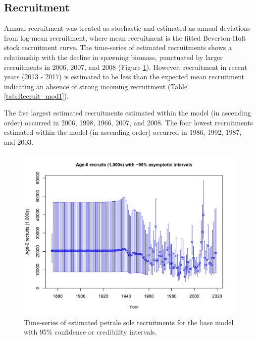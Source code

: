 \documentclass[12pt,]{article}
\begin{document}
\FloatBarrier

\subsection*{Recruitment}\label{recruitment}

Annual recruitment was treated as stochastic and estimated as annual
deviations from log-mean recruitment, where mean recruitment is the
fitted Beverton-Holt stock recruitment curve. The time-series of
estimated recruitments shows a relationship with the decline in spawning
biomass, punctuated by larger recruitments in 2006, 2007, and 2008
(Figure \ref{fig:Recruits_all}). However, recruitment in recent years
(2013 - 2017) is estimated to be less than the expected mean recruitment
indicating an absence of strong incoming recruitment (Table
\ref{tab:Recruit_mod1}).

The five largest estimated recruitments estimated within the model (in
ascending order) occurred in 2006, 1998, 1966, 2007, and 2008. The four
lowest recruitments estimated within the model (in ascending order)
occurred in 1986, 1992, 1987, and 2003.

\begin{figure}
\centering
\includegraphics{r4ss/plots_mod1/ts11_Age-0_recruits_(1000s)_with_95_asymptotic_intervals.png}
\caption{Time-series of estimated petrale sole recruitments for the base
model with 95\% confidence or credibility intervals.
\label{fig:Recruits_all}}
\end{figure}
\end{document}
